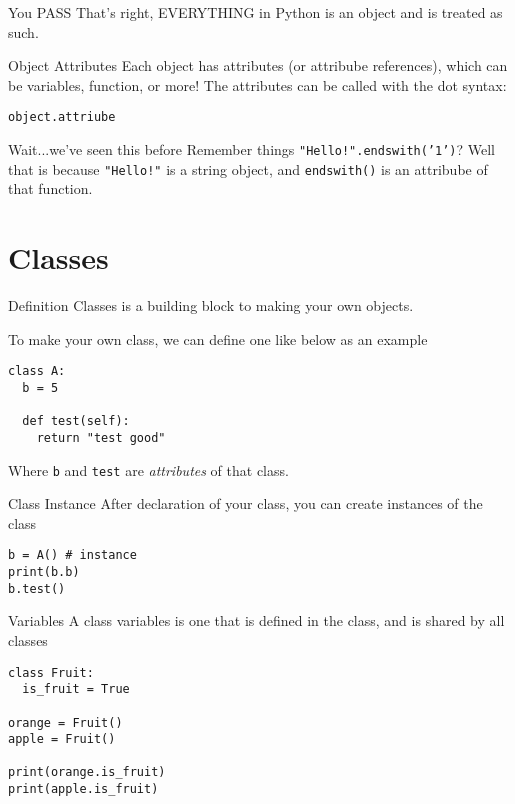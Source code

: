 \begin{frame}{You PASS}
  That's right, EVERYTHING in Python is an object and is treated as such.
\end{frame}

\begin{frame}[containsverbatim]{Object Attributes}
  Each object has attributes (or attribube references), which can be variables, function, or more! The attributes can be called with the dot syntax:

  \texttt{object.attriube}
\end{frame}

\begin{frame}[containsverbatim]{Wait...we've seen this before}
  Remember things \texttt{"Hello!".endswith('1')}? Well that is because \texttt{"Hello!"} is a string object, and \texttt{endswith()} is an attribube of that function.
\end{frame}

\section{Classes}

\begin{frame}[containsverbatim]{Definition}
  Classes is a building block to making your own objects.

  To make your own class, we can define one like below as an example
\begin{verbatim}
class A:
  b = 5

  def test(self):
    return "test good"
\end{verbatim}

Where \verb|b| and \verb|test| are \textit{attributes} of that class.
\end{frame}

\begin{frame}[containsverbatim]{Class Instance}
  After declaration of your class, you can create instances of the class

\begin{verbatim}
b = A() # instance
print(b.b)
b.test()
\end{verbatim}
\end{frame}

\begin{frame}[containsverbatim]{Variables}
  A class variables is one that is defined in the class, and is shared by all classes
\begin{verbatim}
class Fruit:
  is_fruit = True

orange = Fruit()
apple = Fruit()

print(orange.is_fruit)
print(apple.is_fruit)
\end{verbatim}
\end{frame}

